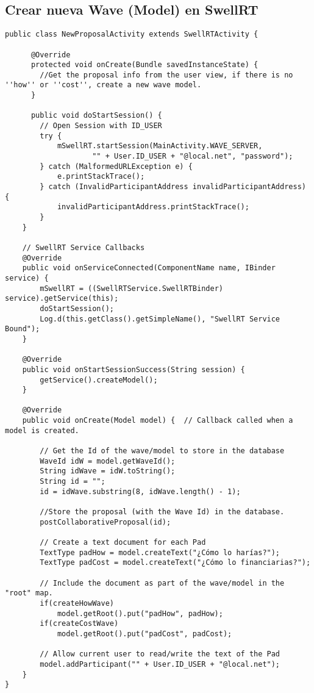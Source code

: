 \subsection{Crear nueva Wave (Model) en SwellRT} \label{ssec:waveCreateModel}

	  \begin{lstlisting}[frame=single]  
public class NewProposalActivity extends SwellRTActivity {
	  
	  @Override
	  protected void onCreate(Bundle savedInstanceState) {
	  	//Get the proposal info from the user view, if there is no ''how'' or ''cost'', create a new wave model.
	  }
	  
	  public void doStartSession() {
        // Open Session with ID_USER
        try {
            mSwellRT.startSession(MainActivity.WAVE_SERVER,
                    "" + User.ID_USER + "@local.net", "password");
        } catch (MalformedURLException e) {
            e.printStackTrace();
        } catch (InvalidParticipantAddress invalidParticipantAddress) {
            invalidParticipantAddress.printStackTrace();
        }
    }

    // SwellRT Service Callbacks
    @Override
    public void onServiceConnected(ComponentName name, IBinder service) {
        mSwellRT = ((SwellRTService.SwellRTBinder) service).getService(this);
        doStartSession();
        Log.d(this.getClass().getSimpleName(), "SwellRT Service Bound");
    }
    
    @Override
    public void onStartSessionSuccess(String session) {		
		getService().createModel();
    }
   
    @Override
    public void onCreate(Model model) {  // Callback called when a model is created.
        
        // Get the Id of the wave/model to store in the database
        WaveId idW = model.getWaveId();
        String idWave = idW.toString();
        String id = "";
        id = idWave.substring(8, idWave.length() - 1);

        //Store the proposal (with the Wave Id) in the database.
        postCollaborativeProposal(id);

        // Create a text document for each Pad
        TextType padHow = model.createText("¿Cómo lo harías?");
        TextType padCost = model.createText("¿Cómo lo financiarias?");

        // Include the document as part of the wave/model in the "root" map.
        if(createHowWave)
            model.getRoot().put("padHow", padHow);
        if(createCostWave)
            model.getRoot().put("padCost", padCost);

        // Allow current user to read/write the text of the Pad
        model.addParticipant("" + User.ID_USER + "@local.net");
    }  	
}	  
	  \end{lstlisting}
	  
